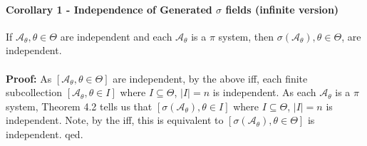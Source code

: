 \documentclass[12pt,a4paper]{article}
\newcommand{\1}[1]{\mathbbm{1}\left\{ #1 \right\}}
\newcommand{\acal}{\mathcal{A}}
\begin{document}
\paragraph{Corollary 1 - Independence of Generated $\sigma$ fields (infinite version)} If $\acal_\theta, \theta \in \Theta$ are independent and each $\acal_\theta$ is a $\pi$ system, then $\sigma(\acal_\theta), \theta \in \Theta$, are independent.
\\\\
\textbf{Proof:} As $[\acal_\theta, \theta \in \Theta]$ are independent, by the above iff, each finite subcollection $[\acal_\theta, \theta \in I]$ where $I \subseteq \Theta$, $|I| = n$ is independent. As each $\acal_\theta$ is a $\pi$ system, Theorem 4.2 tells us that $[\sigma(\acal_\theta), \theta \in I]$ where $I \subseteq \Theta$, $|I| = n$ is independent. Note, by the iff, this is equivalent to $[\sigma(\acal_\theta), \theta \in \Theta]$ is independent. qed.
\end{document}
